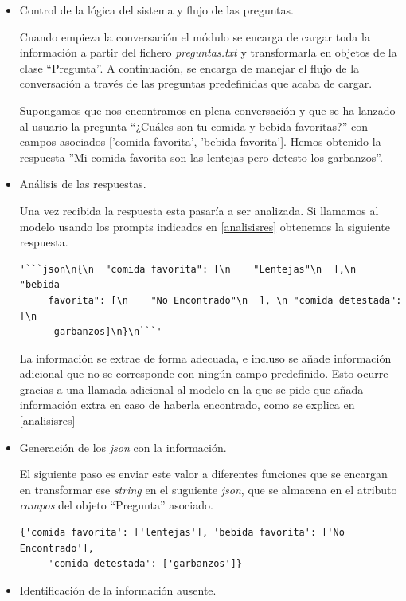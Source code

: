 \begin{itemize}
	\item Control de la lógica del sistema y flujo de las preguntas.
	
	 Cuando empieza la conversación el módulo se encarga de cargar toda la información a partir del fichero \textit{preguntas.txt} y transformarla en objetos de la clase ``Pregunta''. A continuación, se encarga de manejar el flujo de la conversación a través de las preguntas predefinidas que acaba de cargar.
	 
	 Supongamos que nos encontramos en plena conversación y que se ha lanzado al usuario la pregunta ``¿Cuáles son tu comida y bebida favoritas?'' con campos asociados ['comida favorita', 'bebida favorita']. Hemos obtenido la respuesta ''Mi comida favorita son las lentejas pero detesto los garbanzos''.
	
	\item Análisis de las respuestas.
	
	 Una vez recibida la respuesta esta pasaría a ser analizada. Si llamamos al modelo usando los prompts indicados en \ref{analisisres} obtenemos la siguiente respuesta. 
\begin{verbatim}
'```json\n{\n  "comida favorita": [\n    "Lentejas"\n  ],\n  "bebida
	 favorita": [\n    "No Encontrado"\n  ], \n "comida detestada":[\n
	  garbanzos]\n}\n```'
\end{verbatim}

La información se extrae de forma adecuada, e incluso se añade información adicional que no se corresponde con ningún campo predefinido. Esto ocurre gracias a una llamada adicional al modelo en la que se pide que añada información extra en caso de haberla encontrado, como se explica en \ref{analisisres}

	\item Generación de los \textit{json} con la información.

El siguiente paso es enviar este valor a diferentes funciones que se encargan en transformar ese \textit{string} en el suguiente \textit{json}, que se almacena en el atributo \textit{campos} del objeto ``Pregunta'' asociado. 
\begin{verbatim}
{'comida favorita': ['lentejas'], 'bebida favorita': ['No Encontrado'],
	 'comida detestada': ['garbanzos']}
\end{verbatim}

	\item Identificación de la información ausente.
	

\end{itemize}
